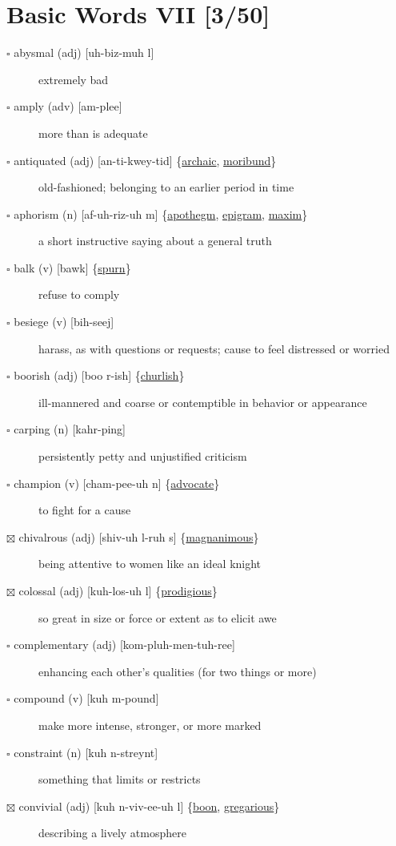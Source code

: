 \documentclass[11pt]{article}
\begin{document}
\section{Basic Words VII [3/50]}
\label{sec:orgf563833}
\begin{description}
\item[{$\square$ abysmal (adj) [uh-biz-muh l]}] extremely bad
\item[{$\square$ amply (adv) [am-plee]}] more than is adequate
\item[{$\square$ \label{org770b44b}antiquated (adj) [an-ti-kwey-tid] \{\hyperref[orge2aa941]{archaic}, \hyperref[orga846e6f]{moribund}\}}] old-fashioned; belonging to an earlier period in time
\item[{$\square$ \label{org7a7c9aa}aphorism (n) [af-uh-riz-uh m] \{\hyperref[org3dc6b52]{apothegm}, \hyperref[org46c3fc2]{epigram}, \hyperref[org0130f55]{maxim}\}}] a short instructive saying about a general truth
\item[{$\square$ \label{org368dc62}balk (v) [bawk] \{\hyperref[org82b46fa]{spurn}\}}] refuse to comply
\item[{$\square$ besiege (v) [bih-seej]}] harass, as with questions or requests; cause to feel distressed or worried
\item[{$\square$ \label{org50a170f}boorish (adj) [boo r-ish] \{\hyperref[orgbee7def]{churlish}\}}] ill-mannered and coarse or contemptible in behavior or appearance
\item[{$\square$ carping (n) [kahr-ping]}] persistently petty and unjustified criticism
\item[{$\square$ \label{orgaa86f17}champion (v) [cham-pee-uh n] \{\hyperref[org63e2995]{advocate}\}}] to fight for a cause
\item[{$\boxtimes$ \label{org97372a8}chivalrous (adj) [shiv-uh l-ruh s] \{\hyperref[org5218078]{magnanimous}\}}] being attentive to women like an ideal knight
\item[{$\boxtimes$ \label{orgfa4dfe8}colossal (adj) [kuh-los-uh l] \{\hyperref[org3dbdf94]{prodigious}\}}] so great in size or force or extent as to elicit awe
\item[{$\square$ complementary (adj) [kom-pluh-men-tuh-ree]}] enhancing each other's qualities (for two things or more)
\item[{$\square$ compound (v) [kuh m-pound]}] make more intense, stronger, or more marked
\item[{$\square$ constraint (n) [kuh n-streynt]}] something that limits or restricts
\item[{$\boxtimes$ \label{org12e2a2b}convivial (adj) [kuh n-viv-ee-uh l] \{\hyperref[org2311542]{boon}, \hyperref[orgdebaeb2]{gregarious}\}}] describing a lively atmosphere

\end{description}
\end{document}
